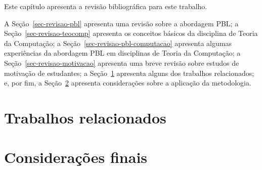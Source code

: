\label{cap-revisao}
\acresetall

Este capítulo apresenta a revisão bibliográfica para este trabalho.

A Seção~\ref{sec-revisao-pbl} apresenta uma revisão sobre a abordagem PBL;
a Seção~\ref{sec-revisao-teocomp} apresenta os conceitos básicos da disciplina
de Teoria da Computação;
a Seção~\ref{sec-revisao-pbl-computacao} apresenta algumas experiências da
abordagem PBL em disciplinas de Teoria da Computação;
a Seção~\ref{sec-revisao-motivacao} apresenta uma breve revisão sobre
estudos de motivação de estudantes;
a Seção~\ref{sec-revisao-relacionados} apresenta alguns dos trabalhos
relacionados;
e, por fim, a Seção~\ref{sec-revisao-consideracoes} apresenta
considerações sobre a aplicação da metodologia.






\section{Trabalhos relacionados}
\label{sec-revisao-relacionados}
\section{Considerações finais}
\label{sec-revisao-consideracoes}
